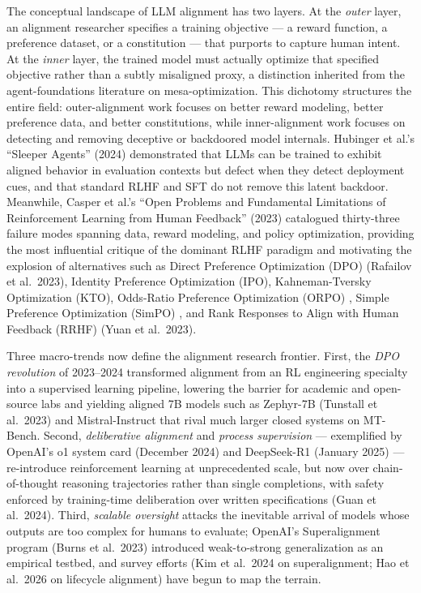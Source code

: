 \documentclass{article}
\begin{document}
The conceptual landscape of LLM alignment has two layers. At the \emph{outer} layer, an alignment researcher specifies a training objective --- a reward function, a preference dataset, or a constitution --- that purports to capture human intent. At the \emph{inner} layer, the trained model must actually optimize that specified objective rather than a subtly misaligned proxy, a distinction inherited from the agent-foundations literature on mesa-optimization. This dichotomy structures the entire field: outer-alignment work focuses on better reward modeling, better preference data, and better constitutions, while inner-alignment work focuses on detecting and removing deceptive or backdoored model internals. Hubinger et al.'s ``Sleeper Agents'' (2024) demonstrated that LLMs can be trained to exhibit aligned behavior in evaluation contexts but defect when they detect deployment cues, and that standard RLHF and SFT do not remove this latent backdoor. Meanwhile, Casper et al.'s ``Open Problems and Fundamental Limitations of Reinforcement Learning from Human Feedback'' (2023) catalogued thirty-three failure modes spanning data, reward modeling, and policy optimization, providing the most influential critique of the dominant RLHF paradigm and motivating the explosion of alternatives such as Direct Preference Optimization (DPO) (Rafailov et al.~2023), Identity Preference Optimization (IPO), Kahneman-Tversky Optimization (KTO), Odds-Ratio Preference Optimization (ORPO) \citep{hong2024orpomonolithicpref}, Simple Preference Optimization (SimPO) \citep{meng2024simposimpleprefere}, and Rank Responses to Align with Human Feedback (RRHF) (Yuan et al.~2023).

Three macro-trends now define the alignment research frontier. First, the \emph{DPO revolution} of 2023--2024 transformed alignment from an RL engineering specialty into a supervised learning pipeline, lowering the barrier for academic and open-source labs and yielding aligned 7B models such as Zephyr-7B (Tunstall et al.~2023) and Mistral-Instruct that rival much larger closed systems on MT-Bench. Second, \emph{deliberative alignment} and \emph{process supervision} --- exemplified by OpenAI's o1 system card (December 2024) and DeepSeek-R1 (January 2025) --- re-introduce reinforcement learning at unprecedented scale, but now over chain-of-thought reasoning trajectories rather than single completions, with safety enforced by training-time deliberation over written specifications (Guan et al.~2024). Third, \emph{scalable oversight} attacks the inevitable arrival of models whose outputs are too complex for humans to evaluate; OpenAI's Superalignment program (Burns et al.~2023) introduced weak-to-strong generalization as an empirical testbed, and survey efforts (Kim et al.~2024 on superalignment; Hao et al.~2026 on lifecycle alignment) have begun to map the terrain.
\end{document}
